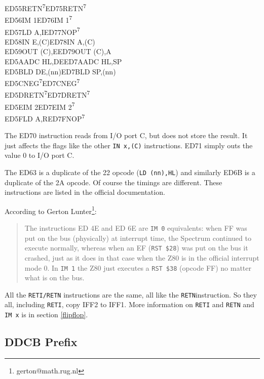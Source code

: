 \documentclass[twoside,openright,a4paper]{book}
\newcommand{\See}[1]{\textsuperscript{#1}}
\begin{document}
{\begin{tabbing}
		{\qquad}ED55\>RETN{\See{7}}\>ED75\>RETN{\See{7}}\\
		{\qquad}ED56\>IM 1\>ED76\>IM 1{\See{7}}\\
		{\qquad}ED57\>LD A,I\>ED77\>NOP{\See{7}}\\
		{\qquad}ED58\>IN E,(C)\>ED78\>IN A,(C)\\
		{\qquad}ED59\>OUT (C),E\>ED79\>OUT (C),A\\
		{\qquad}ED5A\>ADC HL,DE\>ED7A\>ADC HL,SP\\
		{\qquad}ED5B\>LD DE,(nn)\>ED7B\>LD SP,(nn)\\
		{\qquad}ED5C\>NEG{\See{7}}\>ED7C\>NEG{\See{7}}\\
		{\qquad}ED5D\>RETN{\See{7}}\>ED7D\>RETN{\See{7}}\\
		{\qquad}ED5E\>IM 2\>ED7E\>IM 2{\See{7}}\\
		{\qquad}ED5F\>LD A,R\>ED7F\>NOP{\See{7}}\\
	\end{tabbing}
}
\renewcommand{\thefootnote}{\arabic{footnote}}

The ED70 instruction reads from I/O port C, but does not store the result. It just affects the flags like the other {\tt IN x,(C)} instructions. ED71 simply outs the value 0 to I/O port C.

The ED63 is a duplicate of the 22 opcode ({\tt LD (nn),HL}) and similarly ED6B is a duplicate of the 2A opcode. Of course the timings are different. These instructions are listed in the official documentation.

According to Gerton Lunter\footnote{gerton@math.rug.nl}:

\begin{quote}
	The instructions ED 4E and ED 6E are {\tt IM 0} equivalents: when FF was put on the bus (physically) at interrupt time, the Spectrum continued to execute normally, whereas when an EF ({\tt RST \$28}) was put on the bus it crashed, just as it does in that case when the Z80 is in the official interrupt mode 0. In {\tt IM 1} the Z80 just executes a {\tt RST \$38} (opcode FF) no matter what is on the bus.
\end{quote}

All the {\tt RETI/RETN} instructions are the same, all like the {\tt RETN}instruction. So they all, including {\tt RETI}, copy IFF2 to IFF1. More information on {\tt RETI} and {\tt RETN} and {\tt IM x} is in section \ref{flipflop}.


\subsection{DDCB Prefix}
\label{prefix_cbdd}
\end{document}
